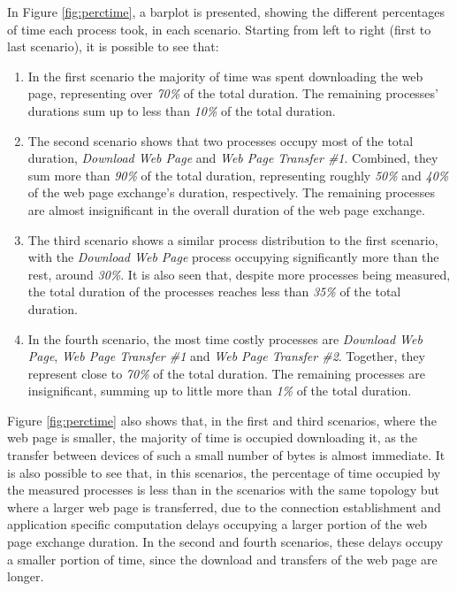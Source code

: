 In Figure \ref{fig:perctime}, a barplot is presented, showing the different percentages of time each process took, in each scenario. Starting from left to right (first to last scenario), it is possible to see that:

\begin{enumerate}
	\item In the first scenario the majority of time was spent downloading the web page, representing over \textit{70\%} of the total duration. The remaining processes' durations sum up to less than \textit{10\%} of the total duration.
	
	\item The second scenario shows that two processes occupy most of the total duration, \textit{Download Web Page} and \textit{Web Page Transfer \#1}. Combined, they sum more than \textit{90\%} of the total duration, representing roughly \textit{50\%} and \textit{40\%} of the web page exchange's duration, respectively. The remaining processes are almost insignificant in the overall duration of the web page exchange.
	
	\item The third scenario shows a similar process distribution to the first scenario, with the \textit{Download Web Page} process occupying significantly more than the rest, around \textit{30\%}. It is also seen that, despite more processes being measured, the total duration of the processes reaches less than \textit{35\%} of the total duration.
	
	\item In the fourth scenario, the most time costly processes are \textit{Download Web Page}, \textit{Web Page Transfer \#1} and \textit{Web Page Transfer \#2}. Together, they represent close to \textit{70\%} of the total duration. The remaining processes are insignificant, summing up to little more than \textit{1\%} of the total duration.
\end{enumerate}

Figure \ref{fig:perctime} also shows that, in the first and third scenarios, where the web page is smaller, the majority of time is occupied downloading it, as the transfer between devices of such a small number of bytes is almost immediate. It is also possible to see that, in this scenarios, the percentage of time occupied by the measured processes is less than in the scenarios with the same topology but where a larger web page is transferred, due to the connection establishment and application specific computation delays occupying a larger portion of the web page exchange duration. In the second and fourth scenarios, these delays occupy a smaller portion of time, since the download and transfers of the web page are longer.

